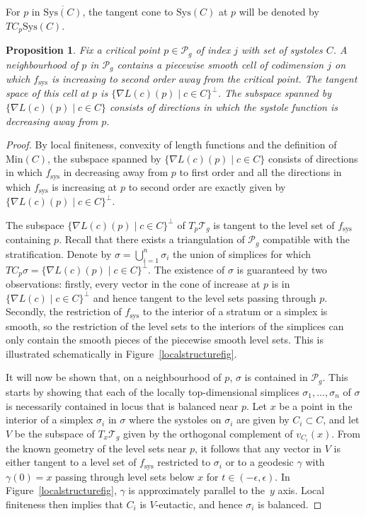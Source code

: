 \documentclass[11pt]{article}
\numberwithin{equation}{section}
\numberwithin{equation}{section}
\newtheorem{Proposition}[Theorem]{Proposition}
\begin{document}
For $p$ in $\overline{\mathrm{Sys}(C)}$, the tangent cone to $\mathrm{Sys}(C)$ at $p$ will be denoted by $TC_{p}\mathrm{Sys}(C)$.

\begin{Proposition}
\label{localstructure}
Fix a critical point $p\in \mathcal{P}_{g}$ of index $j$ with set of systoles $C$. A neighbourhood of $p$ in $\mathcal{P}_{g}$ contains a piecewise smooth cell of codimension $j$ on which $f_{\mathrm{sys}}$ is increasing to second order away from the critical point. The tangent space of this cell at $p$ is $\{\nabla L(c)(p) \mid c\in C\}^{\perp}$. The subspace spanned by $\{\nabla L(c)(p) \mid c\in C\}$ consists of directions in which the systole function is decreasing away from $p$.
\end{Proposition}

\begin{proof}
By local finiteness, convexity of length functions and the definition of $\mathrm{Min}(C)$, the subspace spanned by $\{\nabla L(c)(p) \mid c\in C\}$ consists of directions in which $f_{\mathrm{sys}}$ in decreasing away from $p$ to first order and all the directions in which $f_{\mathrm{sys}}$ is increasing at $p$ to second order are exactly given by $\{\nabla L(c)(p) \mid c\in C\}^{\perp}$.

The subspace $\{\nabla L(c)(p) \mid c\in C\}^{\perp}$ of $T_{p}\mathcal{T}_{g}$ is tangent to the level set of $f_{\mathrm{sys}}$ containing $p$. Recall that there exists a triangulation of $\mathcal{P}_{g}$ compatible with the stratification. Denote by $\sigma=\bigcup_{i=1}^{n}\sigma_{i}$ the union of simplices for which $TC_{p}\sigma=\{\nabla L(c)(p) \mid c\in C\}^{\perp}$. The existence of $\sigma$ is guaranteed by two observations: firstly, every vector in the cone of increase at $p$ is in $\{\nabla L(c) \mid c\in C\}^{\perp}$ and hence tangent to the level sets passing through $p$. Secondly, the restriction of $f_{\mathrm{sys}}$ to the interior of a stratum or a simplex is smooth, so the restriction of the level sets to the interiors of the simplices can only contain the smooth pieces of the piecewise smooth level sets. This is illustrated schematically in Figure~\ref{localstructurefig}.

It will now be shown that, on a neighbourhood of $p$, $\sigma$ is contained in $\mathcal{P}_{g}$. This starts by showing that each of the locally top-dimensional simplices $\sigma_{1}, \dots, \sigma_{n}$ of $\sigma$ is necessarily contained in locus that is balanced near $p$. Let $x$ be a point in the interior of a simplex $\sigma_{i}$ in $\sigma$ where the systoles on $\sigma_{i}$ are given by $C_{i}\subset C$, and let $V$ be the subspace of $T_{x}\mathcal{T}_{g}$ given by the orthogonal complement of $v_{C_{i}}(x)$. From the known geometry of the level sets near $p$, it follows that any vector in $V$ is either tangent to a level set of $f_{\mathrm{sys}}$ restricted to $\sigma_{i}$ or to a geodesic $\gamma$ with $\gamma(0)=x$ passing through level sets below $x$ for $t\in (-\epsilon,\epsilon)$. In Figure~\ref{localstructurefig}, $\gamma$ is approximately parallel to the~$y$ axis. Local finiteness then implies that $C_{i}$ is $V$-eutactic, and hence $\sigma_{i}$ is balanced.


\end{proof}
\end{document}
